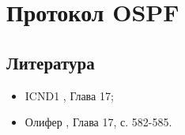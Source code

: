 \section{Протокол OSPF}
\subsection{Литература}
\begin{itemize}
	\item ICND1 \cite{icnd1eng}, Глава 17;
	\item Олифер \cite{olipher}, Глава 17, с. 582-585.
\end{itemize}